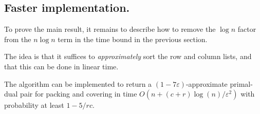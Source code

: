 \documentclass[11pt]{svjour3} \usepackage{fullpage}
\newcommand{\eps}{\varepsilon}
\newcommand{\prob}[1]{{\sc #1}\xspace}
\renewcommand{\prob}[1]{{#1}\xspace}
\newcommand{\rows}{r}
\newcommand{\columns}{c}
\newcommand{\inputsize}{n}
\begin{document}
\subsection{Faster implementation.}

To prove the main result,
it remains to describe how to remove the $\log \inputsize$ factor
from the $\inputsize\log \inputsize$ term in the time bound in the previous section.

The idea is that it suffices 
to {\em approximately} sort the row and column lists,
and that this can be done in linear time.

\begin{theorem}\label{thm:fast}
The algorithm can be implemented to return a $(1-7\eps)$-approximate primal-dual pair for \prob{packing} and \prob{covering} in time $O(\inputsize+(\columns+\rows)\log(\inputsize)/\eps^2)$
with probability at least $1-5/rc$.
\end{theorem}
\end{document}
